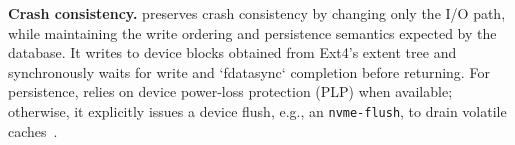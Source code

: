 

{\bf Crash consistency.} \odes preserves crash consistency by changing only the I/O path, while maintaining the write ordering and persistence semantics expected by the database. It writes to device blocks obtained from Ext4's extent tree and synchronously waits for write and `fdatasync` completion before returning. %
For persistence, \odes relies on device power-loss protection (PLP) when available; otherwise, it explicitly issues a device flush, e.g., an {\tt nvme-flush}, to drain volatile caches~\cite{fsync:bio-flags}.

